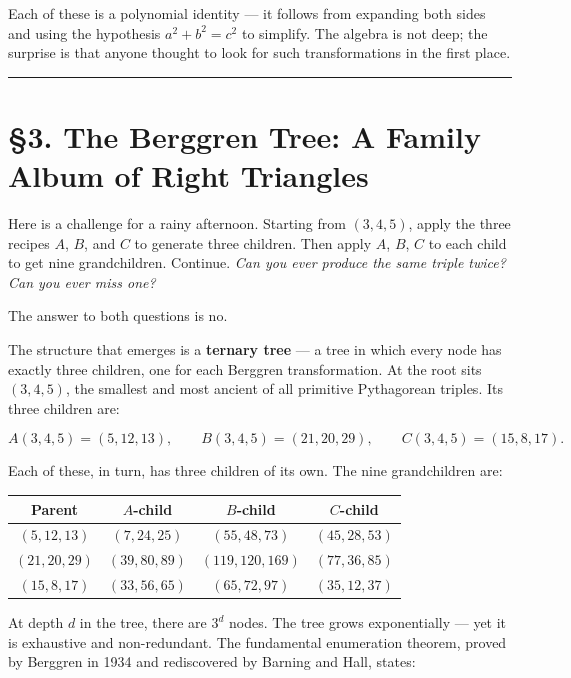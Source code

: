 \documentclass[11pt,openany]{book}
\theoremstyle{definition}
\theoremstyle{plain}
\theoremstyle{remark}
\begin{document}
Each of these is a polynomial identity — it follows from expanding both sides and using the hypothesis $a^2 + b^2 = c^2$ to simplify. The algebra is not deep; the surprise is that anyone thought to look for such transformations in the first place.

\bigskip\noindent\rule{\textwidth}{0.4pt}\bigskip


\section{§3. The Berggren Tree: A Family Album of Right Triangles}


Here is a challenge for a rainy afternoon. Starting from $(3, 4, 5)$, apply the three recipes $A$, $B$, and $C$ to generate three children. Then apply $A$, $B$, $C$ to each child to get nine grandchildren. Continue. \textit{Can you ever produce the same triple twice? Can you ever miss one?}

The answer to both questions is no.

The structure that emerges is a \textbf{ternary tree} — a tree in which every node has exactly three children, one for each Berggren transformation. At the root sits $(3, 4, 5)$, the smallest and most ancient of all primitive Pythagorean triples. Its three children are:

$$A(3,4,5) = (5, 12, 13), \qquad B(3,4,5) = (21, 20, 29), \qquad C(3,4,5) = (15, 8, 17).$$

Each of these, in turn, has three children of its own. The nine grandchildren are:

\begin{center}
\begin{tabular}{c|c|c|c}
\toprule
Parent & $A$-child & $B$-child & $C$-child \\
\midrule
$(5, 12, 13)$ & $(7, 24, 25)$ & $(55, 48, 73)$ & $(45, 28, 53)$ \\
$(21, 20, 29)$ & $(39, 80, 89)$ & $(119, 120, 169)$ & $(77, 36, 85)$ \\
$(15, 8, 17)$ & $(33, 56, 65)$ & $(65, 72, 97)$ & $(35, 12, 37)$ \\
\bottomrule
\end{tabular}
\end{center}


At depth $d$ in the tree, there are $3^d$ nodes. The tree grows exponentially — yet it is exhaustive and non-redundant. The fundamental enumeration theorem, proved by Berggren in 1934 and rediscovered by Barning and Hall, states:
\end{document}
